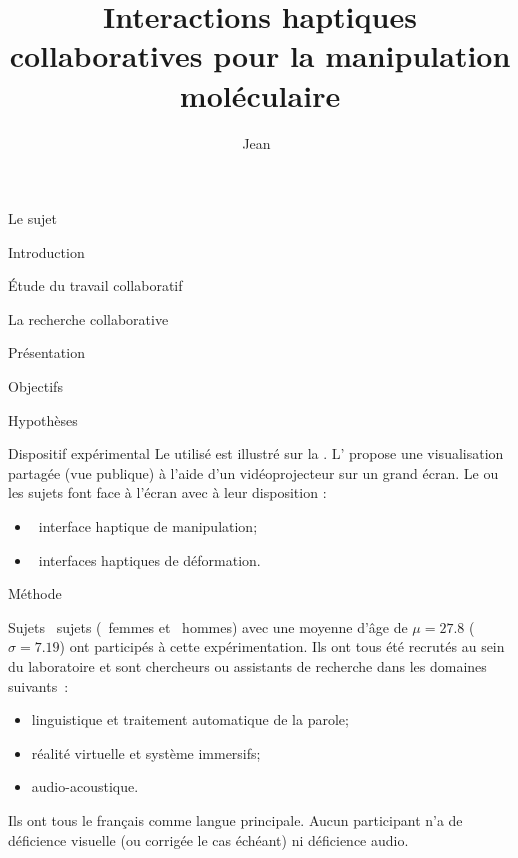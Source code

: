 \documentclass[myfrancais]{mythesis}
\title{Interactions haptiques collaboratives pour la manipulation moléculaire}
\author{Jean~\myname{Simard}}
\date{\mydate[datestyle=long]{01/12/2011}}
\begin{document}
	\frontmatter
	\maketitle
	\mytoc
	\mylof
	\mylot
	\mylotodo
	\mainmatter
	\begin{mypart}{Le sujet}
		\begin{mychapter}{Introduction}
		\end{mychapter}
	\end{mypart}
	\begin{mypart}{Étude du travail collaboratif}
		\begin{mychapter}{La recherche collaborative}
			\begin{mysection}{Présentation}
				\begin{mysubsection}{Objectifs}
				\end{mysubsection}
				\begin{mysubsection}{Hypothèses}
				\end{mysubsection}
			\end{mysection}
			\begin{mysection}{Dispositif expérimental}
				Le  utilisé est illustré sur la .
				L' propose une visualisation partagée (vue publique) à l'aide d'un vidéoprojecteur sur un grand écran.
				Le ou les sujets font face à l'écran avec à leur disposition :
				\begin{itemize}
					\item {}~interface haptique de manipulation;
					\item {}~interfaces haptiques de déformation.
				\end{itemize}

				\begin{myfigure}
				\end{myfigure}
			\end{mysection}
			\begin{mysection}{Méthode}
				\begin{mysubsection}{Sujets}
					~sujets (~femmes et ~hommes) avec une moyenne d'âge de $\mu = 27.8$ ($\sigma = 7.19$) ont participés à cette expérimentation.
					Ils ont tous été recrutés au sein du laboratoire  et sont chercheurs ou assistants de recherche dans les domaines suivants~:
					\begin{itemize}
						\item linguistique et traitement automatique de la parole;
						\item réalité virtuelle et système immersifs;
						\item audio-acoustique.
					\end{itemize}
					Ils ont tous le français comme langue principale.
					Aucun participant n'a de déficience visuelle (ou corrigée le cas échéant) ni déficience audio.


\end{mysubsection}
\end{mysection}
\end{mychapter}
\end{mypart}
\end{document}
